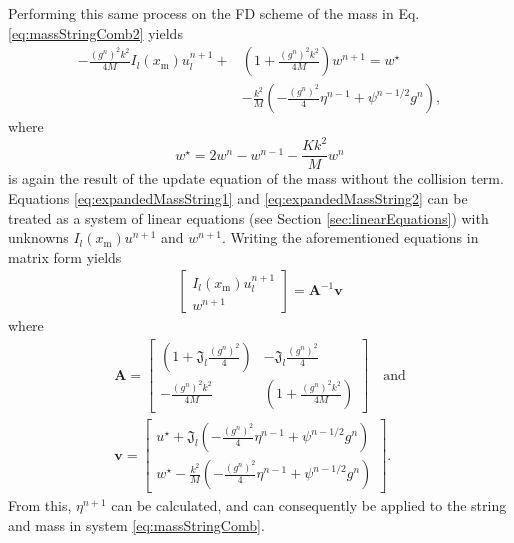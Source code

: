 Performing this same process on the FD scheme of the mass in Eq. \eqref{eq:massStringComb2} yields
\begin{equation}\label{eq:expandedMassString2}
    \begin{aligned}
    -\frac{(g^n)^2 k^2}{4M} I_l(x_\text{m})u_l^{n+1} + &\left(1 + \frac{(g^n)^2 k^2}{4M}\right)w^{n+1} = w^\star\\
    & - \frac{k^2}{M} \left(-\frac{(g^n)^2}{4}\eta^{n-1} + \psi^{n-1/2}g^n\right),
    \end{aligned}
\end{equation}
where 
\begin{equation*}
    w^\star = 2w^n - w^{n-1} - \frac{Kk^2}{M}w^n
\end{equation*}
is again the result of the update equation of the mass without the collision term.
Equations \eqref{eq:expandedMassString1} and \eqref{eq:expandedMassString2} can be treated as a system of linear equations (see Section \ref{sec:linearEquations}) with unknowns $I_l(x_\text{m})u^{n+1}$ and $w^{n+1}$. Writing the aforementioned equations in matrix form yields
\begin{align}
    \begin{bmatrix}
            I_l(x_\text{m})u^{n+1}_l\\
            w^{n+1}
        \end{bmatrix}
        = 
        \mathbf{A}^{-1}\mathbf{v}
    \end{align}
    where
    \begin{equation}
    \begin{gathered}
    \mathbf{A} = 
        \begin{bmatrix}
            \left(1 + \mathfrak{J}_l\frac{(g^n)^2}{4}\right) & -\mathfrak{J}_l\frac{(g^n)^2}{4}\\
            -\frac{(g^n)^2 k^2}{4M} &\left(1 + \frac{(g^n)^2 k^2}{4M}\right)
        \end{bmatrix}
        \quad \text{and}\\
        \mathbf{v} = 
        \begin{bmatrix}
            u^\star + \mathfrak{J}_l \left(-\frac{(g^n)^2}{4}\eta^{n-1} + \psi^{n-1/2}g^n\right)\\
            w^\star- \frac{k^2}{M} \left(-\frac{(g^n)^2}{4}\eta^{n-1} + \psi^{n-1/2}g^n\right)
        \end{bmatrix}.
        \nonumber
    \end{gathered}
\end{equation}
From this, $\eta^{n+1}$ can be calculated, and can consequently be applied to the string and mass in system \eqref{eq:massStringComb}.
